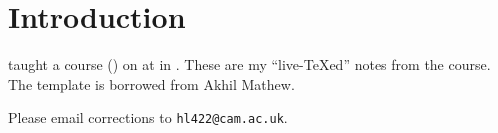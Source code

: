 \title{\thecoursename}
\author{Lectures delivered  by \thelecturer \\ Notes by \thescribe}
\date{\thesemester, \thelocation}
\renewcommand{\headrulewidth}{0pt}
\fancyhead{}
\fancyfoot{}\maketitle
\begin{center}

\end{center}
\pagestyle{fancy}

\tableofcontents

\newpage 
\section*{Introduction}

\thelecturer{} taught a course (\thecoursenum{}) on \thecoursename{} at
\thelocation{} in \thesemester{}.  
These are my ``live-\TeX ed'' notes from the course.  The template is borrowed from Akhil Mathew.





Please email corrections to
\verb=hl422@cam.ac.uk=.

\newpage


\fancyfoot[C]{\thepage}


\renewcommand{\whattosay}{Lecture \thesection \\ }
\pagestyle{fancy}
